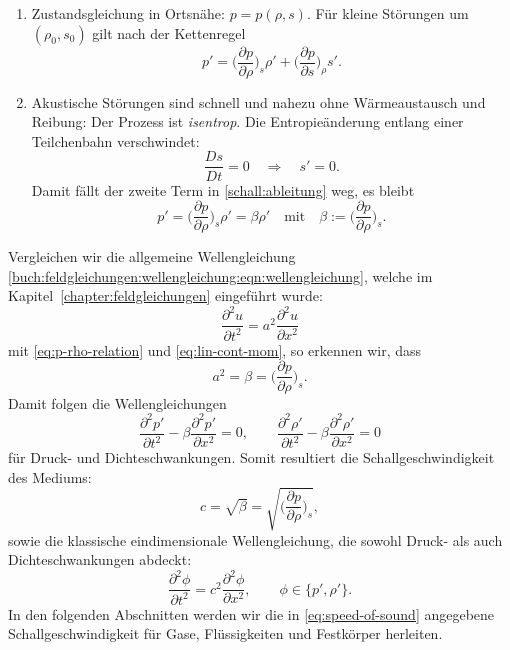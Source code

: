 \begin{enumerate}
\item Zustandsgleichung in Ortsnähe: $p=p(\rho,s)$.
      Für kleine Störungen um $(\rho_0,s_0)$ gilt nach der Kettenregel
      \begin{equation}
        p' = \biggl(\frac{\partial p}{\partial \rho}\biggr)_{s}\rho'
             + \biggl(\frac{\partial p}{\partial s}\biggr)_{\rho}s'.
	\label{schall:ableitung}
      \end{equation}
\item Akustische Störungen sind schnell und nahezu ohne Wärmeaustausch
      und Reibung: Der Prozess ist \emph{isentrop}.
      Die Entropieänderung entlang einer Teilchenbahn verschwindet:
      \[
        \frac{Ds}{Dt}=0
        \quad\Rightarrow\quad s'=0.
      \]
      Damit fällt der zweite Term in \eqref{schall:ableitung} weg, es bleibt
      \begin{equation}
        p' = \biggl(\frac{\partial p}{\partial \rho}\biggr)_{s}\rho' = \beta\rho'
\quad\text{mit}\quad \beta :=
        \biggl(\frac{\partial p}{\partial \rho}\biggr)_{s}.
        \label{eq:p-rho-relation}
      \end{equation}
\end{enumerate}
Vergleichen wir die allgemeine Wellengleichung \eqref{buch:feldgleichungen:wellengleichung:eqn:wellengleichung},
welche im Kapitel~\ref{chapter:feldgleichungen} eingeführt wurde:
\[
    \frac{\partial^2 u}{\partial t^2} =a^2 \frac{\partial^2 u}{\partial x^2}
\]
mit \eqref{eq:p-rho-relation} und \eqref{eq:lin-cont-mom}, so erkennen wir, dass
\[    a^2 = \beta = \biggl(\frac{\partial p}{\partial \rho}\biggr)_{s}.\]
Damit folgen die Wellengleichungen
\begin{equation}
    \frac{\partial^2 p'}{\partial t^2} - \beta\frac{\partial^2 p'}{\partial x^2} = 0,
    \qquad
    \frac{\partial^2 \rho'}{\partial t^2} - \beta\frac{\partial^2 \rho'}{\partial x^2} = 0
    \label{eq:wave-equation-p-rho}
\end{equation}
für Druck- und Dichteschwankungen.
Somit resultiert die Schallgeschwindigkeit des Mediums:
\begin{equation}
    c = \sqrt{\beta} = \sqrt{\biggl(\frac{\partial p}{\partial \rho}\biggr)_{s}},
    \label{eq:speed-of-sound}
\end{equation}
sowie die klassische eindimensionale Wellengleichung, die sowohl
Druck- als auch Dichteschwankungen abdeckt:
\begin{equation}
    \frac{\partial^2 \phi}{\partial t^2} = c^2
    \frac{\partial^2 \phi}{\partial x^2}, \qquad \phi\in\{p',\rho'\}.
    \label{eq:1d-wave-equation}
\end{equation}
In den folgenden Abschnitten werden wir die in \eqref{eq:speed-of-sound}
angegebene Schallgeschwindigkeit für Gase, Flüssigkeiten und Festkörper
herleiten.

